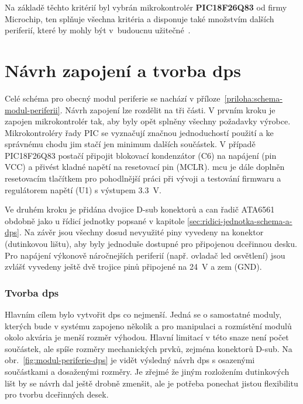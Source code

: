         Na základě těchto kritérií byl vybrán mikrokontrolér \textbf{PIC18F26Q83} od firmy Microchip, ten splňuje všechna kritéria a disponuje také množstvím dalších periferií, které by mohly být v~budoucnu užitečné~\cite{PIC18F26Q83}.

    \section{Návrh zapojení a tvorba \acs{dps}}
        Celé schéma pro obecný modul periferie se nachází v příloze~\ref{priloha:schema-modul-periferii}. Návrh zapojení lze rozdělit na tři části. V prvním kroku je zapojen mikrokontrolér tak, aby byly opět splněny všechny požadavky výrobce. Mikrokontroléry řady PIC se vyznačují značnou jednoduchostí použití a ke správnému chodu jim stačí jen minimum dalších součástek. V případě PIC18F26Q83 postačí připojit blokovací kondenzátor (C6) na napájení (pin VCC) a přivést kladné napětí na resetovací pin (MCLR). \acs{mcu} je dále doplněn resetovacím tlačítkem pro pohodlnější práci při vývoji a testování firmwaru a regulátorem napětí (U1) s výstupem \qty{3.3}{V}. 

        Ve druhém kroku je přidána dvojice D-sub konektorů a \acs{can} řadič ATA6561 obdobně jako u řídicí jednotky popsané v kapitole \ref{sec:ridici-jednotka-schema-a-dps}. Na závěr jsou všechny dosud nevyužité piny vyvedeny na konektor (dutinkovou lištu), aby byly jednoduše dostupné pro připojenou dceřinnou desku. Pro napájení výkonově náročnejších periferií (např. ovladač \acs{led} osvětlení) jsou zvlášť vyvedeny ještě dvě trojice pinů připojené na \qty{24}{V} a zem (GND).

        \subsubsection{Tvorba \acs{dps}}
        Hlavním cílem bylo vytvořit \acs{dps} co nejmenší. Jedná se o samostatné moduly, kterých bude v systému zapojeno několik a pro manipulaci a rozmístění modulů okolo akvária je menší rozměr výhodou. Hlavní limitací v této snaze není počet součástek, ale spíše rozměry mechanických prvků, zejména konektorů D-sub. Na obr.~\ref{fig:modul-periferie-dps} je vidět výsledný návrh \acs{dps} s osazenými součástkami a dosaženými rozměry. Je zřejmé že jiným rozložením dutinkových lišt by se návrh dal ještě drobně zmenšit, ale je potřeba ponechat jistou flexibilitu pro tvorbu dceřinných desek.


